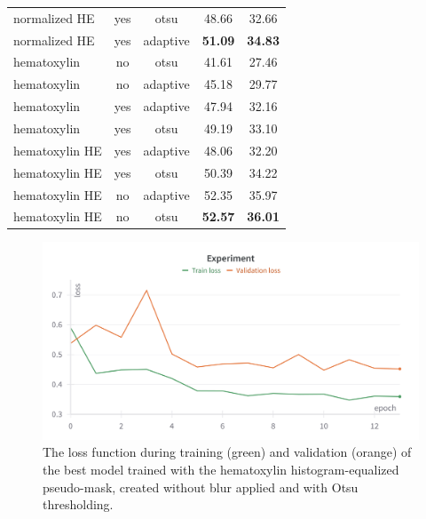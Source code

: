 \begin{table}[H]
\begin{tabular}{ l | c | c | c | c }
    normalized HE & yes & otsu     & 48.66 & 32.66 \\
    normalized HE & yes & adaptive & \textbf{51.09} & \textbf{34.83} \\[0.5ex]
    \hline
    hematoxylin   & no  & otsu     & 41.61 & 27.46 \\
    hematoxylin   & no  & adaptive & 45.18 & 29.77 \\
    hematoxylin   & yes & adaptive & 47.94 & 32.16 \\
    hematoxylin   & yes & otsu     & 49.19 & 33.10 \\
    hematoxylin HE& yes & adaptive & 48.06 & 32.20 \\
    hematoxylin HE& yes & otsu     & 50.39 & 34.22 \\
    hematoxylin HE& no  & adaptive & 52.35 & 35.97 \\
    hematoxylin HE& no  & otsu     & \textbf{52.57} & \textbf{36.01} \\
    \hline
  \end{tabular}
  \label{tab:gen-res}
\end{table}

\begin{figure}[H]
\begin{centering}
\includegraphics[width=\textwidth]{assets/images/for_presentation/exp2-loss.png}
\par\end{centering}
\caption{The loss function during training (green) and validation (orange) of the best model trained with the hematoxylin histogram-equalized pseudo-mask, created without blur applied and with Otsu thresholding.
\label{fig:exp2-loss}}
\end{figure}

